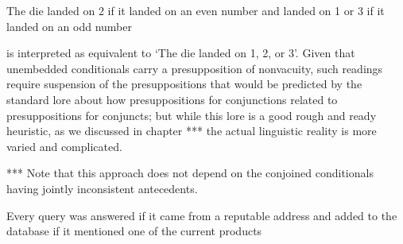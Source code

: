 \documentclass[If.tex]{subfiles}
\begin{document}
\begin{prop}
	\nitem \label{mcdermott}
	The die landed on 2 if it landed on an even number and landed on 1 or 3 if it landed on an odd number
\end{prop}
is interpreted as equivalent to ‘The die landed on 1, 2, or 3’. Given that unembedded conditionals carry a presupposition of nonvacuity, such readings require suspension of the presuppositions that would be predicted by the standard lore about how presuppositions for conjunctions related to presuppositions for conjuncts; but while this lore is a good rough and ready heuristic, as we discussed in chapter *** the actual linguistic reality is more varied and complicated.  

*** 
Note that this approach does not depend on the conjoined conditionals having jointly inconsistent antecedents.
\begin{prop}
	\item	
	Every query was answered if it came from a reputable address and added to the database if it mentioned one of the current products
\end{prop}
\end{document}
